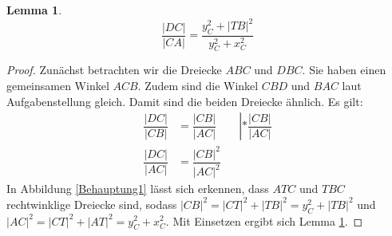 \documentclass[12pt]{article}
\numberwithin{equation}{subsection}
\newtheorem{lemma}{Lemma}
\begin{document}
\begin{lemma}
\[\dfrac{|DC|}{|CA|}=\dfrac{y_C^2+|TB|^2}{y_C^2+x_C^2}\]
\label{lemma32}
\end{lemma}

\begin{proof}
Zunächst betrachten wir die Dreiecke $ABC$ und $DBC$. Sie haben einen gemeinsamen Winkel $ACB$. Zudem sind die Winkel $CBD$ und $BAC$ laut Aufgabenstellung gleich. Damit sind die beiden Dreiecke ähnlich. Es gilt:
\begin{align*}
	\dfrac{|DC|}{|CB|}&=\dfrac{|CB|}{|AC|}&&\left|*\dfrac{|CB|}{|AC|}\right.\\
	\dfrac{|DC|}{|AC|}&=\dfrac{|CB|^2}{|AC|^2}
\end{align*}
In Abbildung \ref{Behauptung1} lässt sich erkennen, dass $ATC$ und $TBC$ rechtwinklige Dreiecke sind, sodass
$|CB|^2=|CT|^2+|TB|^2=y_C^2+|TB|^2$ und $|AC|^2=|CT|^2+|AT|^2=y_C^2+x_C^2$.
Mit Einsetzen ergibt sich Lemma \ref{lemma32}.
\end{proof}
\end{document}

